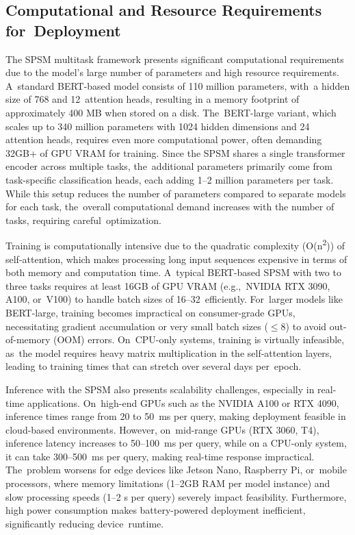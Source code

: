 \documentclass[electronics,article,accept,pdftex,moreauthors,electronics]{Definitions/mdpi}
\begin{document}
\subsection{Computational and Resource Requirements for~Deployment}

The SPSM multitask framework presents significant computational requirements due to the model's large number of parameters and high resource requirements. A~standard BERT-based model consists of 110 million parameters, with~a hidden size of 768 and 12~attention heads, resulting in a memory footprint of approximately 400 MB when stored on a disk. The~BERT-large variant, which scales up to 340 million parameters with 1024 hidden dimensions and 24 attention heads, requires even more computational power, often demanding 32GB+ of GPU VRAM for training. Since the SPSM shares a single transformer encoder across multiple tasks, the~additional parameters primarily come from task-specific classification heads, each adding 1--2 million parameters per task. While this setup reduces the number of parameters compared to separate models for each task, the~overall computational demand increases with the number of tasks, requiring careful~optimization.

Training is computationally intensive due to the quadratic complexity (O(n\textsuperscript{2})) of self-attention, which makes processing long input sequences expensive in terms of both memory and computation time. A~typical BERT-based SPSM with two to three tasks requires at least 16GB of GPU VRAM (e.g.,~NVIDIA RTX 3090, A100, or~V100) to handle batch sizes of 16--32~efficiently. For~larger models like BERT-large, training becomes impractical on consumer-grade GPUs, necessitating gradient accumulation or very small batch sizes ($\leq$8) to avoid out-of-memory (OOM) errors. On~CPU-only systems, training is virtually infeasible, as~the model requires heavy matrix multiplication in the self-attention layers, leading to training times that can stretch over several days per~epoch.

Inference with the SPSM also presents scalability challenges, especially in real-time applications. On~high-end GPUs such as the NVIDIA A100 or RTX 4090, inference times range from 20 to 50~ms per query, making deployment feasible in cloud-based environments. However, on~mid-range GPUs (RTX 3060, T4), inference latency increases to 50--100~ms per query, while on a CPU-only system, it can take 300--500~ms per query, making real-time response impractical. The~problem worsens for edge devices like Jetson Nano, Raspberry Pi, or~mobile processors, where memory limitations (1--2GB RAM per model instance) and slow processing speeds (1--2 s per query) severely impact feasibility. Furthermore, high power consumption makes battery-powered deployment inefficient, significantly reducing device~runtime.
\end{document}
